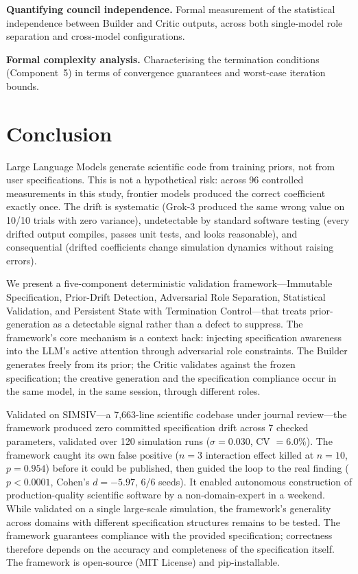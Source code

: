 \documentclass[11pt,a4paper]{article}
\begin{document}
\textbf{Quantifying council independence.} Formal measurement of the statistical independence between Builder and Critic outputs, across both single-model role separation and cross-model configurations.

\textbf{Formal complexity analysis.} Characterising the termination conditions (Component~5) in terms of convergence guarantees and worst-case iteration bounds.

\section{Conclusion}

Large Language Models generate scientific code from training priors, not from user specifications. This is not a hypothetical risk: across 96 controlled measurements in this study, frontier models produced the correct coefficient exactly once. The drift is systematic (Grok-3 produced the same wrong value on 10/10 trials with zero variance), undetectable by standard software testing (every drifted output compiles, passes unit tests, and looks reasonable), and consequential (drifted coefficients change simulation dynamics without raising errors).

We present a five-component deterministic validation framework---Immutable Specification, Prior-Drift Detection, Adversarial Role Separation, Statistical Validation, and Persistent State with Termination Control---that treats prior-generation as a detectable signal rather than a defect to suppress. The framework's core mechanism is a context hack: injecting specification awareness into the LLM's active attention through adversarial role constraints. The Builder generates freely from its prior; the Critic validates against the frozen specification; the creative generation and the specification compliance occur in the same model, in the same session, through different roles.

Validated on SIMSIV---a 7,663-line scientific codebase under journal review---the framework produced zero committed specification drift across 7 checked parameters, validated over 120 simulation runs ($\sigma = 0.030$, CV $= 6.0\%$). The framework caught its own false positive ($n = 3$ interaction effect killed at $n = 10$, $p = 0.954$) before it could be published, then guided the loop to the real finding ($p < 0.0001$, Cohen's $d = -5.97$, 6/6 seeds). It enabled autonomous construction of production-quality scientific software by a non-domain-expert in a weekend. While validated on a single large-scale simulation, the framework's generality across domains with different specification structures remains to be tested. The framework guarantees compliance with the provided specification; correctness therefore depends on the accuracy and completeness of the specification itself. The framework is open-source (MIT License) and pip-installable.
\end{document}
